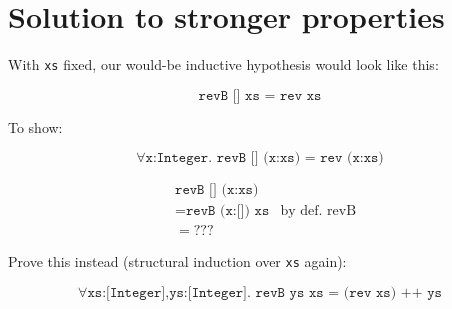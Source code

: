 \documentclass[10pt,a4paper]{article}
\newcommand{\just}[2]{\texttt{#1} & \textrm{#2}}
\begin{document}
\section{Solution to stronger properties}
With \texttt{xs} fixed, our would-be inductive hypothesis would look like this:

\[ \texttt{revB [] xs = rev xs} \]

To show:

\[ \forall \texttt{x:Integer. revB [] (x:xs) = rev (x:xs)} \]

\begin{align*}
& \texttt{revB [] (x:xs)} \\
&= \just{revB (x:[]) xs}{by def. revB} \\
&= ???
\end{align*}

Prove this instead (structural induction over \texttt{xs} again):

\[ \forall \texttt{xs:[Integer],ys:[Integer]. revB ys xs = (rev xs) ++ ys} \]
\end{document}
